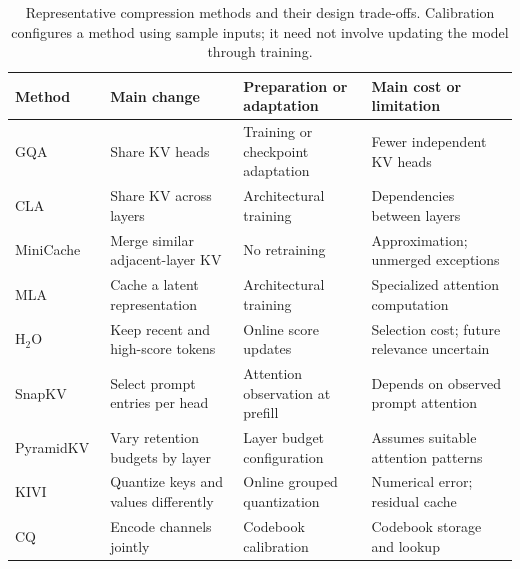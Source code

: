 \begin{table}[t]
    \centering
    \caption{Representative compression methods and their design trade-offs. Calibration configures a method using sample inputs; it need not involve updating the model through training.}
    \label{tab:compression-comparison}
    \begingroup
    \footnotesize
    \setlength{\tabcolsep}{4pt}
    \renewcommand{\arraystretch}{1.15}
    \begin{tabularx}{\textwidth}{@{}>{\raggedright\arraybackslash}p{}>{\raggedright\arraybackslash}p{}>{\raggedright\arraybackslash}p{}>{\raggedright\arraybackslash}X@{}}
        \toprule
        \textbf{Method} & \textbf{Main change} & \textbf{Preparation or adaptation} & \textbf{Main cost or limitation} \\
        \midrule
        GQA~\cite{kv_ainslie2023gqa} & Share KV heads & Training or checkpoint adaptation & Fewer independent KV heads \\
        CLA~\cite{kv_brandon2024cla} & Share KV across layers & Architectural training & Dependencies between layers \\
        MiniCache~\cite{kv_liu2024minicache} & Merge similar adjacent-layer KV & No retraining & Approximation; unmerged exceptions \\
        MLA~\cite{kv_deepseek2024v2} & Cache a latent representation & Architectural training & Specialized attention computation \\
        \addlinespace[4pt]
        H$_2$O~\cite{kv_zhang2023h2o} & Keep recent and high-score tokens & Online score updates & Selection cost; future relevance uncertain \\
        SnapKV~\cite{kv_li2024snapkv} & Select prompt entries per head & Attention observation at prefill & Depends on observed prompt attention \\
        PyramidKV~\cite{kv_cai2025pyramidkv} & Vary retention budgets by layer & Layer budget configuration & Assumes suitable attention patterns \\
        \addlinespace[4pt]
        KIVI~\cite{kv_liu2024kivi} & Quantize keys and values differently & Online grouped quantization & Numerical error; residual cache \\
        CQ~\cite{kv_zhang2024cq} & Encode channels jointly & Codebook calibration & Codebook storage and lookup \\
        \bottomrule
    \end{tabularx}
    \endgroup
\end{table}

